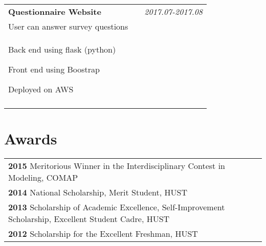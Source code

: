 \documentclass[a4paper,10pt]{article}
\begin{document}
\begin{tabular}{p{13.5cm}p{0.5cm}r}
\textbf{Questionnaire Website} && \emph{2017.07-2017.08} \\
\hspace{1em} User can answer survey questions && \vspace{-0.5em} \\
\begin{compactitem}
  \item Back end using flask (python) \vspace{0.2em}
  \item Front end using Boostrap\vspace{0.2em}
  \item Deployed on AWS \vspace{0.2em}  
\end{compactitem}&&\vspace{-2.2em} \\
\multicolumn{3}{c}{} \\

\end{tabular}


\section{Awards}
\begin{tabular}{l}
\textbf{2015} Meritorious Winner in the Interdisciplinary Contest in Modeling, COMAP \\
\textbf{2014} National Scholarship, Merit Student, HUST \\
\textbf{2013} Scholarship of Academic Excellence, Self-Improvement Scholarship, Excellent Student Cadre, HUST \\
\textbf{2012} Scholarship for the Excellent Freshman, HUST \\
\end{tabular}
\end{document}
